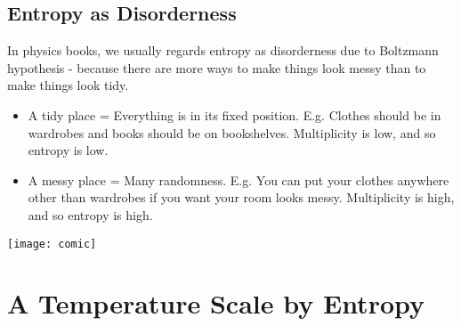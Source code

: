\documentclass[class=article, crop=false, 12pt]{standalone}
\begin{document}
\subsection{Entropy as Disorderness}

In physics books, 
we usually regards entropy as disorderness due to Boltzmann hypothesis - 
because there are more ways to make things look messy than to make things look tidy.
\begin{itemize}
    \item A tidy place = Everything is in its fixed position. 
    E.g. Clothes should be in wardrobes and books should be on bookshelves.
    Multiplicity is low, and so entropy is low.

    \item A messy place = Many randomness. 
    E.g. You can put your clothes anywhere other than wardrobes if you want your room looks messy.
    Multiplicity is high, and so entropy is high.
\end{itemize}

\begin{center}
    \begin{minipage}{0.4\linewidth}
        \centering
        \texttt{[image: comic]}
    \end{minipage}
\end{center}


\linesep
\section{A Temperature Scale by Entropy}
\end{document}
